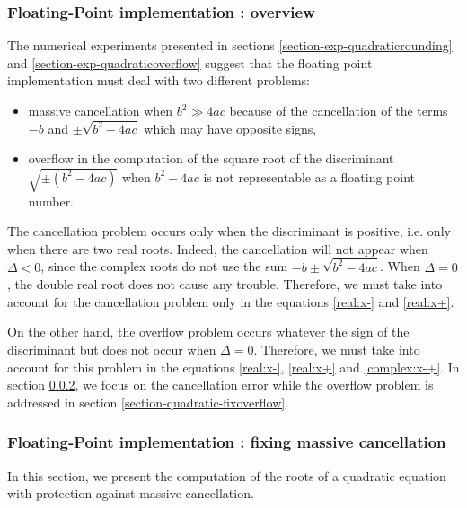 \subsubsection{Floating-Point implementation : overview}

The numerical experiments presented in sections \ref{section-exp-quadraticrounding} and
\ref{section-exp-quadraticoverflow} suggest that the floating point implementation
must deal with two different problems:
\begin{itemize}
\item massive cancellation when $b^2\gg 4ac$ because of the cancellation of the 
terms $-b$ and $\pm\sqrt{b^2-4ac}$ which may have opposite signs,
\item overflow in the computation of the square root of the 
discriminant $\sqrt{\pm(b^2-4ac)}$ when $b^2-4ac$ is not representable as 
a floating point number.
\end{itemize}

The cancellation problem occurs only when the discriminant is positive, i.e. only
when there are two real roots. Indeed, the cancellation will not appear when $\Delta<0$,
since the complex roots do not use the sum $-b\pm\sqrt{b^2-4ac}$.
When $\Delta=0$, the double real root does not cause any trouble.
Therefore, we must take into account for the cancellation problem only in the 
equations \ref{real:x-} and \ref{real:x+}.

On the other hand, the overflow problem occurs whatever the sign of the discriminant
but does not occur when $\Delta=0$. Therefore, we must take into account 
for this problem in the equations \ref{real:x-}, \ref{real:x+} and \ref{complex:x-+}.
In section \ref{section-quadratic-fixcancellation}, we focus on the cancellation error while 
the overflow problem is addressed in section \ref{section-quadratic-fixoverflow}.

\subsubsection{Floating-Point implementation : fixing massive cancellation}
\label{section-quadratic-fixcancellation}
In this section, we present the computation of the roots of a 
quadratic equation with protection against massive cancellation. 

